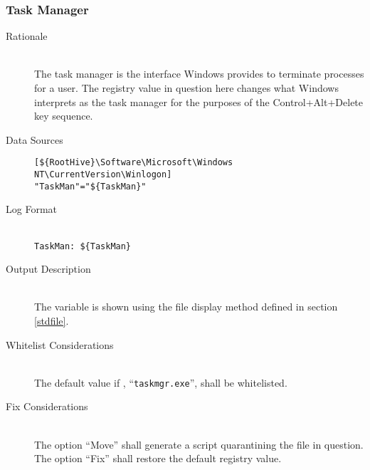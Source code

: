 \subsubsection{Task Manager}
\begin{description}
\item[Rationale] \hfill \\
The task manager is the interface Windows provides to terminate processes for a
user. The registry value in question here changes what Windows interprets as the
task manager for the purposes of the Control+Alt+Delete key sequence.
\item[Data Sources] \hfill
\vspace{-\baselineskip}
\begin{verbatim}
[${RootHive}\Software\Microsoft\Windows NT\CurrentVersion\Winlogon]
"TaskMan"="${TaskMan}"
\end{verbatim}
\item[Log Format] \hfill \\
\verb|TaskMan: ${TaskMan}|
\item[Output Description] \hfill \\
The variable  is shown using the file display method defined in
section \ref{stdfile}.
\item[Whitelist Considerations] \hfill \\
The default value if , ``\verb|taskmgr.exe|'', shall be whitelisted.
\item[Fix Considerations] \hfill \\
The option ``Move'' shall generate a script quarantining the file in question.
The option ``Fix'' shall restore the default registry value.
\end{description}

